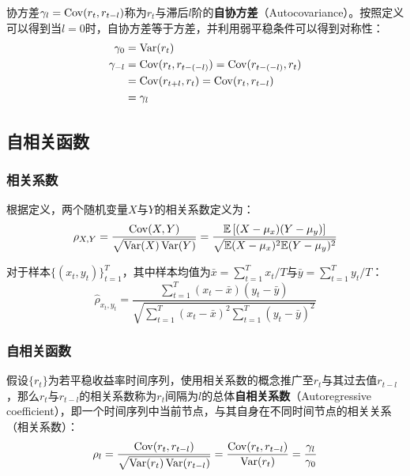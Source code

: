 \documentclass[11pt]{article}
\begin{document}
协方差$\gamma_l = \operatorname{Cov}(r_t,r_{t-l})$称为$r_t$与滞后$l$阶的\textbf{自协方差}（Autocovariance）。按照定义可以得到当$l=0$时，自协方差等于方差，并利用弱平稳条件可以得到对称性：
\begin{align*}
    \gamma_0 &= \operatorname{Var}(r_t) \\
    \gamma_{-l} &= \operatorname{Cov}(r_{t},r_{t-(-l)}) = \operatorname{Cov}(r_{t-(-l)},r_{t}) \\
    &= \operatorname{Cov}(r_{t+l},r_{t}) = \operatorname{Cov}(r_{t},r_{t-l}) \\
    &= \gamma_{l}
\end{align*}

\subsection{自相关函数}

\subsubsection{相关系数}

根据定义，两个随机变量$X$与$Y$的相关系数定义为：
\begin{equation*}
    \rho_{X,Y} = \frac{\operatorname{Cov}(X,Y)}{\sqrt{\operatorname{Var}(X)\operatorname{Var}(Y)}}
    = \frac{\mathbb{E}\left[(X-\mu_x)(Y-\mu_y)\right]}{\sqrt{\mathbb{E}(X-\mu_x)^2 \mathbb{E}(Y-\mu_y)^2}}
\end{equation*}

对于样本$\{(x_t,y_t)\}_{t=1}^{T}$，其中样本均值为$\bar{x}=\sum_{t=1}^{T}x_t/T$与$\bar{y}=\sum_{t=1}^{T}y_t/T$：
\begin{equation*}
    \hat{\rho}_{x_t,y_t} = \frac{\sum_{t=1}^{T}(x_t-\bar{x})(y_t-\bar{y})}{\sqrt{\sum_{t=1}^{T}(x_t-\bar{x})^2 \sum_{t=1}^{T}(y_t-\bar{y})^2}}
\end{equation*}

\subsubsection{自相关函数}

假设$\{r_t\}$为若平稳收益率时间序列，使用相关系数的概念推广至$r_t$与其过去值$r_{t-l}$，那么$r_t$与$r_{t-l}$的相关系数称为$r_{t}$间隔为$l$的总体\textbf{自相关系数}（Autoregressive coefficient），即一个时间序列中当前节点，与其自身在不同时间节点的相关关系（相关系数）：
\begin{equation*}
    \rho_l = \frac{\operatorname{Cov}(r_t,r_{t-l})}{\sqrt{\operatorname{Var}(r_t)\operatorname{Var}(r_{t-l})}} 
    = \frac{\operatorname{Cov}(r_t,r_{t-l})}{\operatorname{Var}(r_t)}
    = \frac{\gamma_l}{\gamma_0}
\end{equation*}
\end{document}
